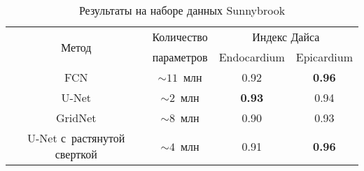 \begin{table}[h]
\begin{center}
    \vspace{0.6cm}
    
    \caption{Результаты на наборе данных Sunnybrook} \label{tab:sunnybrook_results}
    \begin{tabular}{ |c||*{3}{c|} }
      \hline
      \multirow{2}{*}{Метод}      & Количество   & \multicolumn{2}{c|}{Индекс Дайса} \\ \cline{3-4}
                                  & параметров   & Endocardium   & Epicardium        \\ \hline
      \hline
      FCN                         & $\sim11$~млн & 0.92          & \textbf{0.96}     \\ \hline
      U-Net                       &  $\sim2$~млн & \textbf{0.93} & 0.94              \\ \hline
      GridNet                     &  $\sim8$~млн & 0.90          & 0.93              \\ \hline
      U-Net с~растянутой сверткой &  $\sim4$~млн & 0.91          & \textbf{0.96}     \\ 
      \hline
    \end{tabular}
  \end{center}
\end{table}



